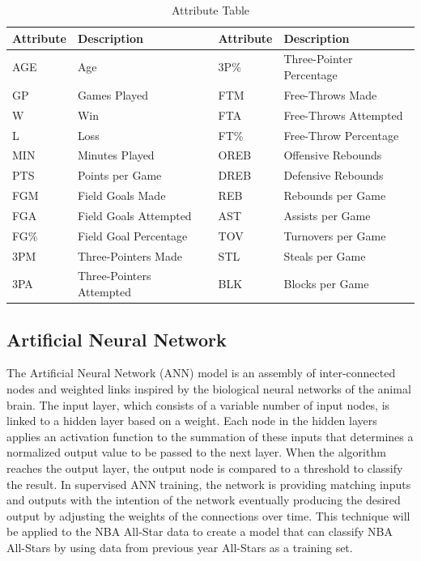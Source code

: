 \documentclass{article}
\begin{document}
\begin{table}
  \caption{Attribute Table}
  \label{attribute-table}
  \centering
  \begin{tabular}{llll}
    \toprule
    Attribute & Description & Attribute & Description \\
    \midrule
    AGE     & Age   & 3P\% &  Three-Pointer Percentage \\
    GP &  Games Played & FTM & Free-Throws Made\\
    W& Win &  FTA & Free-Throws Attempted\\
    L & Loss & FT\% & Free-Throw Percentage\\
    MIN & Minutes Played & OREB & Offensive Rebounds\\
    PTS & Points per Game & DREB & Defensive Rebounds\\
    FGM & Field Goals Made & REB & Rebounds per Game\\
    FGA & Field Goals Attempted & AST & Assists per Game\\
    FG\% & Field Goal Percentage & TOV & Turnovers per Game\\
    3PM & Three-Pointers Made & STL & Steals per Game\\
    3PA & Three-Pointers Attempted & BLK & Blocks per Game\\
    \bottomrule
  \end{tabular}
\end{table}

\subsection{Artificial Neural Network}
The Artificial Neural Network (ANN) model is an assembly of inter-connected nodes and weighted links inspired by the biological neural networks of the animal brain. The input layer, which consists of a variable number of input nodes, is linked to a hidden layer based on a weight. Each node in the hidden layers applies an activation function to the summation of these inputs that determines a normalized output value to be passed to the next layer. When the algorithm reaches the output layer, the output node is compared to a threshold to classify the result. In supervised ANN training, the network is providing matching inputs and outputs with the intention of the network eventually producing the desired output by adjusting the weights of the connections over time. This technique will be applied to the NBA All-Star data to create a model that can classify NBA All-Stars by using data from previous year All-Stars as a training set.
\end{document}
